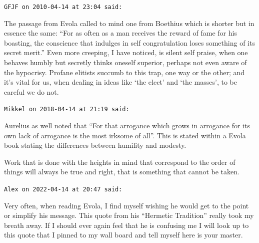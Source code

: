\begin{footnotesize}
\begin{sffamily}
\texttt{GFJF on 2010-04-14 at 23:04 said:}

The passage from Evola called to mind one from Boethius which is shorter but in essence the same: ``For as often as a man receives the reward of fame for his boasting, the conscience that indulges in self congratulation loses something of its secret merit.'' Even more creeping, I have noticed, is silent self praise, when one behaves humbly but secretly thinks oneself superior, perhaps not even aware of the hypocrisy. Profane elitists succumb to this trap, one way or the other; and it's vital for us, when dealing in ideas like `the elect' and `the masses', to be careful we do not.

\hfill

\texttt{Mikkel on 2018-04-14 at 21:19 said:}

Aurelius as well noted that ``For that arrogance which grows in arrogance for its own lack of arrogance is the most irksome of all''. This is stated within a Evola book stating the differences between humility and modesty.

Work that is done with the heights in mind that correspond to the order of things will always be true and right, that is something that cannot be taken.

\hfill

\texttt{Alex on 2022-04-14 at 20:47 said:}

Very often, when reading Evola, I find myself wishing he would get to the point or simplify his message. This quote from his ``Hermetic Tradition'' really took my breath away. If I should ever again feel that he is confusing me I will look up to this quote that I pinned to my wall board and tell myself here is your master.

\end{sffamily}
\end{footnotesize}

